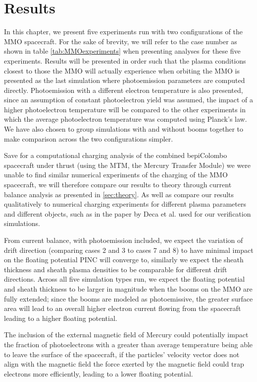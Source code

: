 \chapter{Results}
\label{sec:results}

In this chapter, we present five experiments run with two configurations of the MMO spacecraft. For the sake of brevity, we will refer to the case number as shown in table \ref{tab:MMOexperiments} when presenting analyses for these five experiments. Results will be presented in order such that the plasma conditions closest to those the MMO will actually experience when orbiting the MMO is presented as the last simulation where photoemission parameters are computed directly. Photoemission with a different electron temperature is also presented, since an assumption of constant photoelectron yield was assumed, the impact of a higher photoelectron temperature will be compared to the other experiments in which the average photoelectron temperature was computed using Planck's law. We have also chosen to group simulations with and without booms together to make comparison across the two configurations simpler.

Save for a computational charging analysis of the combined bepiColombo spacecraft under thrust (using the MTM, the Mercury Transfer Module) we were unable to find similar numerical experiments of the charging of the MMO spacecraft, we will therefore compare our results to theory through current balance analysis as presented in \ref{sec:theory}. As well as compare our results qualitatively to numerical charging experiments for different plasma parameters and different objects, such as in the paper by Deca et al. \parencite{Deca2013} used for our verification simulations.

From current balance, with photoemission included, we expect the variation of drift direction (comparing cases 2 and 3 to cases 7 and 8) to have minimal impact on the floating potential PINC will converge to, similarly we expect the sheath thickness and sheath plasma densities to be comparable for different drift directions. Across all five simulation types run, we expect the floating potential and sheath thickness to be larger in magnitude when the booms on the MMO are fully extended; since the booms are modeled as photoemissive, the greater surface area will lead to an overall higher electron current flowing from the spacecraft leading to a higher floating potential. 

The inclusion of the external magnetic field of Mercury could potentially impact the fraction of photoelectrons with a greater than average temperature being able to leave the surface of the spacecraft, if the particles' velocity vector does not align with the magnetic field the force exerted by the magnetic field could trap electrons more efficiently, leading to a lower floating potential.        



